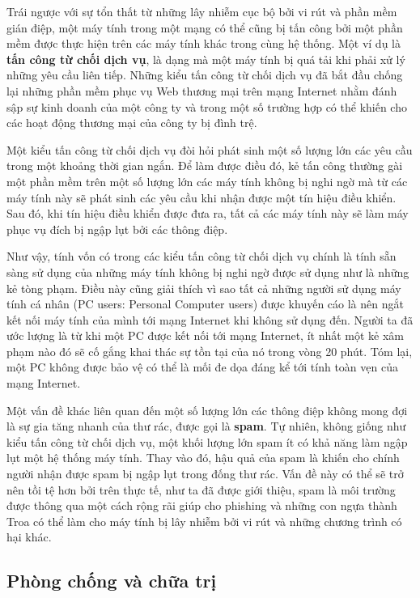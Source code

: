 Trái ngược với sự tổn thất từ những lây nhiễm cục bộ bởi vi rút và phần mềm gián điệp, một
máy tính trong một mạng có thể cũng bị tấn công bởi một phần mềm được thực hiện trên các
máy tính khác trong cùng hệ thống. Một ví dụ là \textbf{tấn công từ chối dịch vụ}, là dạng
mà một máy tính bị quá tải khi phải xử lý những yêu cầu liên tiếp. Những kiểu tấn công từ
chối dịch vụ đã bắt đầu chống lại những phần mềm phục vụ Web thương mại trên mạng Internet
nhằm đánh sập sự kinh doanh của một công ty và trong một số trường hợp có thể khiến cho
các hoạt động thương mại của công ty bị đình trệ.

Một kiểu tấn công từ chối dịch vụ đòi hỏi phát sinh một số lượng lớn các yêu cầu trong một
khoảng thời gian ngắn. Để làm được điều đó, kẻ tấn công thường gài một phần mềm trên một
số lượng lớn các máy tính không bị nghi ngờ mà từ các máy tính này sẽ phát sinh các yêu
cầu khi nhận được một tín hiệu điều khiển. Sau đó, khi tín hiệu điều khiển được đưa ra,
tất cả các máy tính này sẽ làm máy phục vụ đích bị ngập lụt bởi các thông điệp.

Như vậy, tính vốn có trong các kiểu tấn công từ chối dịch vụ chính là tính sẵn sàng sử
dụng của những máy tính không bị nghi ngờ được sử dụng như là những kẻ tòng phạm. Điều này
cũng giải thích vì sao tất cả những người sử dụng máy tính cá nhân (PC users: Personal
Computer users) được khuyến cáo là nên ngắt kết nối máy tính của mình tới mạng Internet
khi không sử dụng đến. Người ta đã ước lượng là từ khi một PC được kết nối tới mạng
Internet, ít nhất một kẻ xâm phạm nào đó sẽ cố gắng khai thác sự tồn tại của nó trong vòng
20 phút. Tóm lại, một PC không được bảo vệ có thể là mối đe dọa đáng kể tới tính toàn vẹn
của mạng Internet.

Một vấn đề khác liên quan đến một số lượng lớn các thông điệp không mong đợi là sự gia
tăng nhanh của thư rác, được gọi là \textbf{spam}. Tự nhiên, không giống như kiểu tấn công
từ chối dịch vụ, một khối lượng lớn spam ít có khả năng làm ngập lụt một hệ thống máy
tính. Thay vào đó, hậu quả của spam là khiến cho chính người nhận được spam bị ngập lụt
trong đống thư rác. Vấn đề này có thể sẽ trở nên tồi tệ hơn bởi trên thực tế, như ta
đã được giới thiệu, spam là môi trường được thông qua một cách rộng rãi giúp cho phishing
và những con ngựa thành Troa có thể làm cho máy tính bị lây nhiễm bởi vi rút và những
chương trình có hại khác.

\subsection*{Phòng chống và chữa trị}

